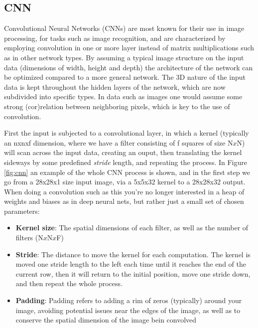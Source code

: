 \subsection{CNN}
Convolutional Neural Networks (CNNs) are most known for their use in image processing, for tasks such as image recognition, and are characterized by employing convolution in one or more layer instead of matrix multiplications such as in other network types. By assuming a typical image structure on the input data (dimensions of width, height and depth) the architecture of the network can be optimized compared to a more general network. The 3D nature of the input data is kept throughout the hidden layers of the network, which are now subdivided into specific types. In data such as images one would assume some strong (cor)relation between neighboring pixels, which is key to the use of convolution.

First the input is subjected to a convolutional layer, in which a kernel (typically an nxnxf dimension, where we have a filter consisting of f squares of size N$x$N) will scan across the input data, creating an ouput, then translating the kernel sideways by some predefined \textit{stride} length, and repeating the process. In Figure \ref{fig:cnn} an example of the whole CNN process is shown, and in the first step we go from a 28x28x1 size input image, via a 5x5x32 kernel to a 28x28x32 output. When doing a convolution such as this you're no longer interested in a heap of weights and biases as in deep neural nets, but rather just a small set of chosen parameters:

\begin{itemize}
 \item \textbf{Kernel size}: The spatial dimensions of each filter, as well as the number of filters (N$x$N$x$F)
 \item \textbf{Stride}: The distance to move the kernel for each computation. The kernel is moved one stride length to the left each time until it reaches the end of the current row, then it will return to the initial position, move one stride down, and then repeat the whole process.
 \item \textbf{Padding}: Padding refers to adding a rim of zeros (typically) around your image, avoiding potential issues near the edges of the image, as well as to conserve the spatial dimension of the image bein convolved 
\end{itemize}




